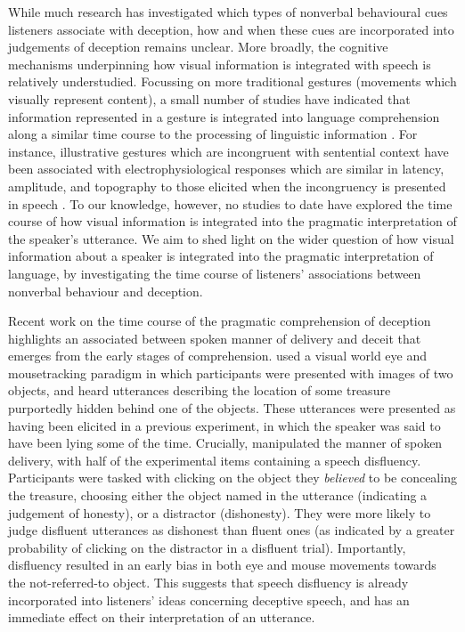 \documentclass[a4paper,man,natbib]{apa6}
\begin{document}
While much research has investigated which types of nonverbal behavioural cues listeners associate with deception, how and when these cues are incorporated into judgements of deception remains unclear. 
More broadly, the cognitive mechanisms underpinning how visual information is integrated with speech is relatively understudied.
Focussing on more traditional gestures (movements which visually represent content), a small number of studies have indicated that information represented in a gesture is integrated into language comprehension along a similar time course to the processing of linguistic information \citep[See e.g.][]{Ozyurek2007, Kelly2004}. 
For instance, illustrative gestures which are incongruent with sentential context have been associated with electrophysiological responses which are similar in latency, amplitude, and topography to those elicited when the incongruency is presented in speech \citep{Ozyurek2007}.
To our knowledge, however, no studies to date have explored the time course of how visual information is integrated into the pragmatic interpretation of the speaker's utterance.
We aim to shed light on the wider question of how visual information about a speaker is integrated into the pragmatic interpretation of language, by investigating the time course of listeners' associations between nonverbal behaviour and deception.


Recent work on the time course of the pragmatic comprehension of deception highlights an associated between spoken manner of delivery and deceit that emerges from the early stages of comprehension.
\citet{Loy2017} used a visual world eye and mousetracking paradigm in which participants were presented with images of two objects, and heard utterances describing the location of some treasure purportedly hidden behind one of the objects.
These utterances were presented as having been elicited in a previous experiment, in which the speaker was said to have been lying some of the time.
Crucially, \citet{Loy2017} manipulated the manner of spoken delivery, with half of the experimental items containing a speech disfluency.
Participants were tasked with clicking on the object they \textit{believed} to be concealing the treasure, choosing either the object named in the utterance (indicating a judgement of honesty), or a distractor (dishonesty).
They were more likely to judge disfluent utterances as dishonest than fluent ones (as indicated by a greater probability of clicking on the distractor in a disfluent trial). 
Importantly, disfluency resulted in an early bias in both eye and mouse movements towards the not-referred-to object.
This suggests that speech disfluency is already incorporated into listeners' ideas concerning deceptive speech, and has an immediate effect on their interpretation of an utterance. 
\end{document}
